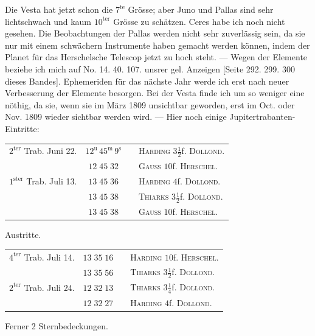 \par\indent Die Vesta hat jetzt schon die $7^{\text{te}}$ Grösse; aber Juno und Pallas sind sehr
lichtschwach und kaum $10^{\text{ter}}$ Grösse zu schätzen. Ceres habe ich noch nicht
gesehen. Die Beobachtungen der Pallas werden nicht sehr zuverlässig sein, da sie nur mit
einem schwächern Instrumente haben gemacht werden können, indem der Planet für das
Herschelsche Telescop jetzt zu hoch steht. --- Wegen der Elemente beziehe ich mich auf
No. 14. 40. 107. unsrer gel. Anzeigen [Seite 292. 299. 300 dieses Bandes]. Ephemeriden für
das nächste Jahr werde ich erst nach neuer Verbesserung der Elemente besorgen. Bei der
Vesta finde ich um so weniger eine nöthig, da sie, wenn sie im März 1809 unsichtbar
geworden, erst im Oct. oder Nov. 1809 wieder sichtbar werden wird. --- Hier noch einige
Jupitertrabanten-Eintritte:

\begin{center}
\fontsize{10}{12}\selectfont\setlength{\tabcolsep}{3pt}\begin{tabular}{lccl}
$2^{\text{ter}}$ Trab. Juni 22. & $12^{\text{u}}\,45^{\text{m}}\,9^{\text{s}}$ & & \textsc{Harding} $3\tfrac12$f. \textsc{Dollond}.\\
& $12\;45\;32$ & & \textsc{Gauss} $10$f. \textsc{Herschel}.\\
$1^{\text{ster}}$ Trab. Juli 13. & $13\;45\;36$ & & \textsc{Harding} $4$f. \textsc{Dollond}.\\
& $13\;45\;38$ & & \textsc{Thiarks} $3\tfrac12$f. \textsc{Dollond}.\\
& $13\;45\;38$ & & \textsc{Gauss} $10$f. \textsc{Herschel}.\\
\end{tabular}

Austritte.

\fontsize{10}{12}\selectfont\setlength{\tabcolsep}{3pt}\begin{tabular}{lccl}
$4^{\text{ter}}$ Trab. Juli 14. & $13\;35\;16$ & & \textsc{Harding} $10$f. \textsc{Herschel}.\\
& $13\;35\;56$ & & \textsc{Thiarks} $3\tfrac12$f. \textsc{Dollond}.\\
$2^{\text{ter}}$ Trab. Juli 24. & $12\;32\;13$ & & \textsc{Thiarks} $3\tfrac14$f. \textsc{Dollond}.\\
& $12\;32\;27$ & & \textsc{Harding} $4$f. \textsc{Dollond}.\\
\end{tabular}
\end{center}

\par\indent Ferner 2 Sternbedeckungen.

